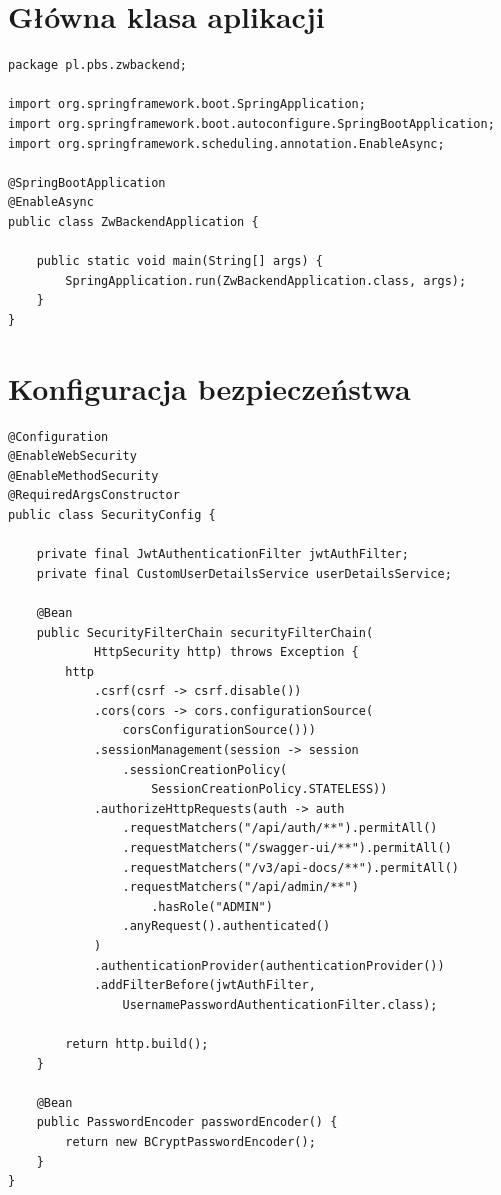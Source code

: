 \documentclass[12pt,a4paper]{report}
\begin{document}
\section{Główna klasa aplikacji}

\begin{lstlisting}[style=javastyle, caption={ZwBackendApplication.java}]
package pl.pbs.zwbackend;

import org.springframework.boot.SpringApplication;
import org.springframework.boot.autoconfigure.SpringBootApplication;
import org.springframework.scheduling.annotation.EnableAsync;

@SpringBootApplication
@EnableAsync
public class ZwBackendApplication {

    public static void main(String[] args) {
        SpringApplication.run(ZwBackendApplication.class, args);
    }
}
\end{lstlisting}

\section{Konfiguracja bezpieczeństwa}

\begin{lstlisting}[style=javastyle, caption={SecurityConfig.java}]
@Configuration
@EnableWebSecurity
@EnableMethodSecurity
@RequiredArgsConstructor
public class SecurityConfig {

    private final JwtAuthenticationFilter jwtAuthFilter;
    private final CustomUserDetailsService userDetailsService;

    @Bean
    public SecurityFilterChain securityFilterChain(
            HttpSecurity http) throws Exception {
        http
            .csrf(csrf -> csrf.disable())
            .cors(cors -> cors.configurationSource(
                corsConfigurationSource()))
            .sessionManagement(session -> session
                .sessionCreationPolicy(
                    SessionCreationPolicy.STATELESS))
            .authorizeHttpRequests(auth -> auth
                .requestMatchers("/api/auth/**").permitAll()
                .requestMatchers("/swagger-ui/**").permitAll()
                .requestMatchers("/v3/api-docs/**").permitAll()
                .requestMatchers("/api/admin/**")
                    .hasRole("ADMIN")
                .anyRequest().authenticated()
            )
            .authenticationProvider(authenticationProvider())
            .addFilterBefore(jwtAuthFilter, 
                UsernamePasswordAuthenticationFilter.class);
        
        return http.build();
    }

    @Bean
    public PasswordEncoder passwordEncoder() {
        return new BCryptPasswordEncoder();
    }
}
\end{lstlisting}
\end{document}
